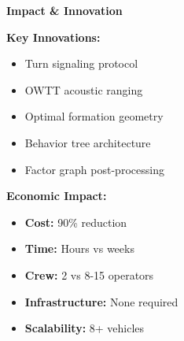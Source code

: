 
\begin{center}
\textbf{\large Impact \& Innovation}
\end{center}

\vspace{0.2em}

\begin{tcolorbox}[colback=waspblue!10, colframe=waspblue, boxrule=0.5pt]
\textbf{Key Innovations:}
\begin{itemize}[leftmargin=1em, itemsep=0.05em]
    \item Turn signaling protocol
    \item OWTT acoustic ranging
    \item Optimal formation geometry
    \item Behavior tree architecture
    \item Factor graph post-processing
\end{itemize}
\end{tcolorbox}

\vspace{0.2em}

\begin{tcolorbox}[colback=darkgreen!10, colframe=darkgreen, boxrule=0.5pt]
\textbf{Economic Impact:}
\begin{itemize}[leftmargin=1em, itemsep=0.05em]
    \item \textbf{Cost:} 90\% reduction
    \item \textbf{Time:} Hours vs weeks
    \item \textbf{Crew:} 2 vs 8-15 operators
    \item \textbf{Infrastructure:} None required
    \item \textbf{Scalability:} 8+ vehicles
\end{itemize}
\end{tcolorbox}
